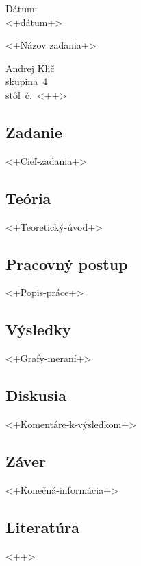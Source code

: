 \documentclass[a4paper,12pt]{article}
\begin{document}
\noindent
\begin{minipage}{0.3\textwidth}
Dátum: \\
<+dátum+>
\end{minipage}
\begin{minipage}{0.38\textwidth}
\begin{center}
\Large{<+Názov zadania+>}
\end{center}
\end{minipage}
\begin{minipage}{0.30\textwidth}
\begin{flushright}
Andrej Klič \\
skupina~4 \\
stôl~č.~<++> \\
\end{flushright}
\end{minipage}

\subsection*{Zadanie}
<+Cieľ-zadania+>

\subsection*{Teória}
<+Teoretický-úvod+>

\subsection*{Pracovný postup}
<+Popis-práce+>

\subsection*{Výsledky}
<+Grafy-meraní+>

\subsection*{Diskusia}
<+Komentáre-k-výsledkom+>

\subsection*{Záver}
<+Konečná-informácia+>

\subsection*{Literatúra}

<++>
\end{document}
